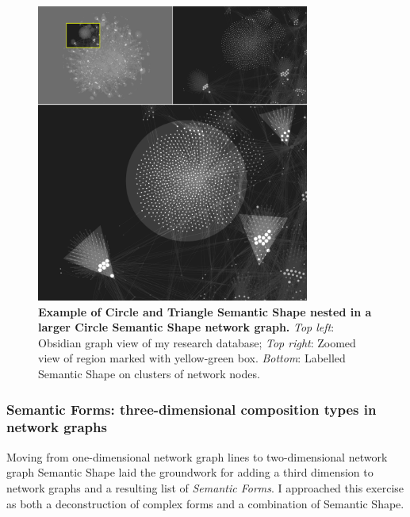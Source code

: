 \begin{figure}[h]
    \centering
    \includegraphics[width=0.8\textwidth]{figures/5.2.png}
    \caption[Example of circle and triangle Semantic Shape nested in a larger Circle Semantic Shape network graph]{\textbf{Example of Circle and Triangle Semantic Shape nested in a larger Circle Semantic Shape network graph.}  \textit{Top left}: Obsidian graph view of my research database; \textit{Top right}: Zoomed view of region marked with yellow-green box. \textit{Bottom}: Labelled Semantic Shape on clusters of network nodes.}
    \label{f5.2}
\end{figure}

\FloatBarrier

\subsubsection{Semantic Forms: three-dimensional composition types in network graphs}
Moving from one-dimensional network graph lines to two-dimensional network graph Semantic Shape laid the groundwork for adding a third dimension to network graphs and a resulting list of \textit{Semantic Forms}. I approached this exercise as both a deconstruction of complex forms and a combination of Semantic Shape. 
  

